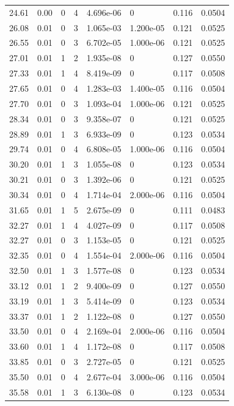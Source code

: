 \documentclass[preview]{standalone}
\begin{document}
{{{\begin{tabular}{L{1.2cm}C{1.2cm} C{0.3cm}C{0.5cm} C{1.4cm}C{1.4cm} C{1.4cm}C{1.4cm}}
  24.61  &  0.00  & 0     &  4 &  4.696e-06  & 0  & 0.116 &  0.0504   \\ 
  26.08  &  0.01  & 0     &  3 &  1.065e-03  & 1.200e-05  & 0.121 &  0.0525   \\ 
  26.55  &  0.01  & 0     &  3 &  6.702e-05  & 1.000e-06  & 0.121 &  0.0525   \\ 
  27.01  &  0.01  & 1     &  2 &  1.935e-08  & 0  & 0.127 &  0.0550   \\ 
  27.33  &  0.01  & 1     &  4 &  8.419e-09  & 0  & 0.117 &  0.0508   \\ 
  27.65  &  0.01  & 0     &  4 &  1.283e-03  & 1.400e-05  & 0.116 &  0.0504   \\ 
  27.70  &  0.01  & 0     &  3 &  1.093e-04  & 1.000e-06  & 0.121 &  0.0525   \\ 
  28.34  &  0.01  & 0     &  3 &  9.358e-07  & 0  & 0.121 &  0.0525   \\ 
  28.89  &  0.01  & 1     &  3 &  6.933e-09  & 0  & 0.123 &  0.0534   \\ 
  29.74  &  0.01  & 0     &  4 &  6.808e-05  & 1.000e-06  & 0.116 &  0.0504   \\ 
  30.20  &  0.01  & 1     &  3 &  1.055e-08  & 0  & 0.123 &  0.0534   \\ 
  30.21  &  0.01  & 0     &  3 &  1.392e-06  & 0  & 0.121 &  0.0525   \\ 
  30.34  &  0.01  & 0     &  4 &  1.714e-04  & 2.000e-06  & 0.116 &  0.0504   \\ 
  31.65  &  0.01  & 1     &  5 &  2.675e-09  & 0  & 0.111 &  0.0483   \\ 
  32.27  &  0.01  & 1     &  4 &  4.027e-09  & 0  & 0.117 &  0.0508   \\ 
  32.27  &  0.01  & 0     &  3 &  1.153e-05  & 0  & 0.121 &  0.0525   \\ 
  32.35  &  0.01  & 0     &  4 &  1.554e-04  & 2.000e-06  & 0.116 &  0.0504   \\ 
  32.50  &  0.01  & 1     &  3 &  1.577e-08  & 0  & 0.123 &  0.0534   \\ 
  33.12  &  0.01  & 1     &  2 &  9.400e-09  & 0  & 0.127 &  0.0550   \\ 
  33.19  &  0.01  & 1     &  3 &  5.414e-09  & 0  & 0.123 &  0.0534   \\ 
  33.37  &  0.01  & 1     &  2 &  1.122e-08  & 0  & 0.127 &  0.0550   \\ 
  33.50  &  0.01  & 0     &  4 &  2.169e-04  & 2.000e-06  & 0.116 &  0.0504   \\ 
  33.60  &  0.01  & 1     &  4 &  1.172e-08  & 0  & 0.117 &  0.0508   \\ 
  33.85  &  0.01  & 0     &  3 &  2.727e-05  & 0  & 0.121 &  0.0525   \\ 
  35.50  &  0.01  & 0     &  4 &  2.677e-04  & 3.000e-06  & 0.116 &  0.0504   \\ 
  35.58  &  0.01  & 1     &  3 &  6.130e-08  & 0  & 0.123 &  0.0534   \\ 
\hline 
\end{tabular} 

}}}
\end{document}
